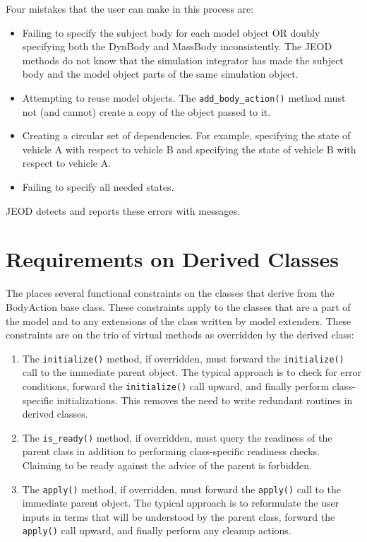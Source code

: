 Four mistakes that the user can make in this process are:
\begin{itemize}
\item Failing to specify the subject body for each model object OR doubly
specifying both the DynBody and MassBody inconsistently.
The JEOD methods do not know that the simulation integrator has made the
subject body and the model object parts of the same simulation object.
\item Attempting to reuse model objects. The {\tt add\_body\_action()}
method must not (and cannot) create a copy of the object passed to it.
\item Creating a circular set of dependencies. For example,
specifying the state of vehicle A with respect to vehicle B and
specifying the state of vehicle B with respect to vehicle A.
\item Failing to specify all needed states.
\end{itemize}
JEOD detects and reports these errors with messages.

\section*{Requirements on Derived Classes}
The \ModelDesc places several functional constraints on the classes
that derive from the BodyAction base class.
These constraints apply to the classes that are a part of the model
and to any extensions of the class written by model extenders.
These constraints are on the trio of virtual methods as overridden
by the derived class:
\begin{enumerate}
\item The {\tt initialize()} method, if overridden,
must forward the {\tt initialize()} call to the immediate parent object.
The typical approach is to check for error conditions,
forward the {\tt initialize()} call  upward, and finally perform
class-specific initializations. This removes the need to write redundant
routines in derived classes.
\item The {\tt is\_ready()} method, if overridden,
must query the readiness of the parent class in addition to
performing class-specific readiness checks. Claiming to be ready
against the advice of the parent is forbidden.
\item The {\tt apply()} method, if overridden,
must forward the {\tt apply()} call to the immediate parent object.
The typical approach is to reformulate the user inputs in terms
that will be understood by the parent class,
forward the {\tt apply()} call  upward, and finally perform
any cleanup actions.
\end{enumerate}

